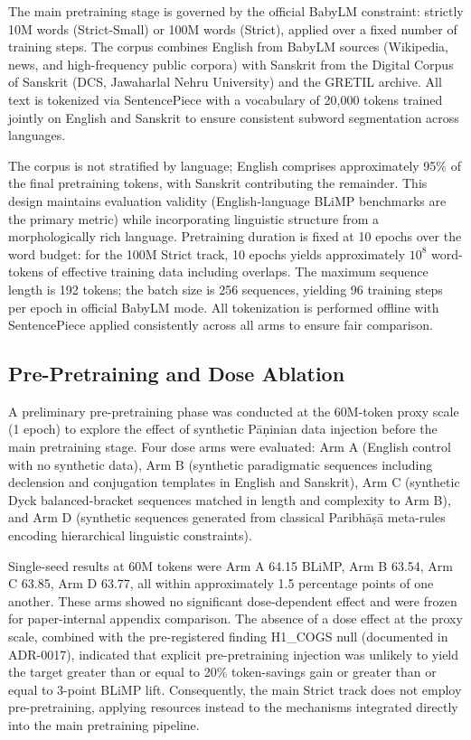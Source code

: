 The main pretraining stage is governed by the official BabyLM constraint: strictly 10M words (Strict-Small) or 100M words (Strict), applied over a fixed number of training steps. The corpus combines English from BabyLM sources (Wikipedia, news, and high-frequency public corpora) with Sanskrit from the Digital Corpus of Sanskrit (DCS, Jawaharlal Nehru University) and the GRETIL archive. All text is tokenized via SentencePiece with a vocabulary of 20,000 tokens trained jointly on English and Sanskrit to ensure consistent subword segmentation across languages.

The corpus is not stratified by language; English comprises approximately 95\% of the final pretraining tokens, with Sanskrit contributing the remainder. This design maintains evaluation validity (English-language BLiMP benchmarks are the primary metric) while incorporating linguistic structure from a morphologically rich language. Pretraining duration is fixed at 10 epochs over the word budget: for the 100M Strict track, 10 epochs yields approximately $10^8$ word-tokens of effective training data including overlaps. The maximum sequence length is 192 tokens; the batch size is 256 sequences, yielding 96 training steps per epoch in official BabyLM mode. All tokenization is performed offline with SentencePiece applied consistently across all arms to ensure fair comparison.

\subsection{Pre-Pretraining and Dose Ablation}

A preliminary pre-pretraining phase was conducted at the 60M-token proxy scale (1 epoch) to explore the effect of synthetic Pāṇinian data injection before the main pretraining stage. Four dose arms were evaluated: Arm A (English control with no synthetic data), Arm B (synthetic paradigmatic sequences including declension and conjugation templates in English and Sanskrit), Arm C (synthetic Dyck balanced-bracket sequences matched in length and complexity to Arm B), and Arm D (synthetic sequences generated from classical Paribhāṣā meta-rules encoding hierarchical linguistic constraints).

Single-seed results at 60M tokens were Arm A 64.15 BLiMP, Arm B 63.54, Arm C 63.85, Arm D 63.77, all within approximately 1.5 percentage points of one another. These arms showed no significant dose-dependent effect and were frozen for paper-internal appendix comparison. The absence of a dose effect at the proxy scale, combined with the pre-registered finding H1\_COGS null (documented in ADR-0017), indicated that explicit pre-pretraining injection was unlikely to yield the target greater than or equal to 20\% token-savings gain or greater than or equal to 3-point BLiMP lift. Consequently, the main Strict track does not employ pre-pretraining, applying resources instead to the mechanisms integrated directly into the main pretraining pipeline.

